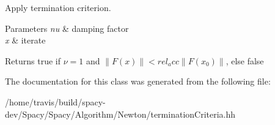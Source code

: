Apply termination criterion. 


\begin{DoxyParams}{Parameters}
{\em nu} & damping factor \\
\hline
{\em x} & iterate \\
\hline
\end{DoxyParams}
\begin{DoxyReturn}{Returns}
true if $\nu=1$ and $ \|F(x)\|<rel_acc\|F(x_0)\| $, else false 
\end{DoxyReturn}


The documentation for this class was generated from the following file\-:\begin{DoxyCompactItemize}
\item 
/home/travis/build/spacy-\/dev/\-Spacy/\-Spacy/\-Algorithm/\-Newton/termination\-Criteria.\-hh\end{DoxyCompactItemize}
